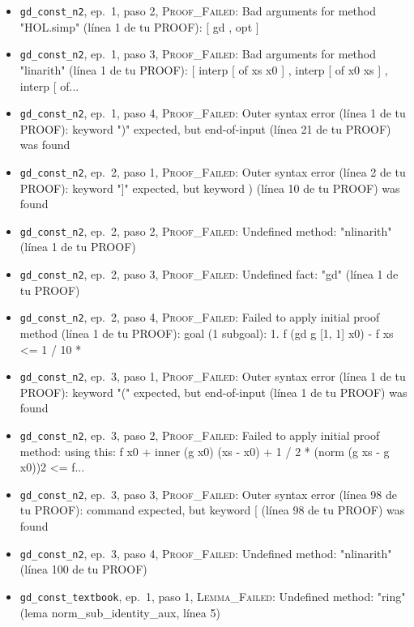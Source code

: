 \documentclass[11pt,a4paper]{article}
\begin{document}
{\begin{itemize}
  \item \texttt{gd\_\allowbreak{}const\_\allowbreak{}n2}, ep.~1, paso 2, \textsc{Proof\_Failed}: Bad arguments for method "HOL.simp" (línea 1 de tu PROOF): [ gd , opt ]
  \item \texttt{gd\_\allowbreak{}const\_\allowbreak{}n2}, ep.~1, paso 3, \textsc{Proof\_Failed}: Bad arguments for method "linarith" (línea 1 de tu PROOF): [ interp [ of xs x0 ] , interp [ of x0 xs ] , interp [ of...
  \item \texttt{gd\_\allowbreak{}const\_\allowbreak{}n2}, ep.~1, paso 4, \textsc{Proof\_Failed}: Outer syntax error (línea 1 de tu PROOF): keyword ")" expected, but end-of-input (línea 21 de tu PROOF) was found
  \item \texttt{gd\_\allowbreak{}const\_\allowbreak{}n2}, ep.~2, paso 1, \textsc{Proof\_Failed}: Outer syntax error (línea 2 de tu PROOF): keyword "]" expected, but keyword ) (línea 10 de tu PROOF) was found
  \item \texttt{gd\_\allowbreak{}const\_\allowbreak{}n2}, ep.~2, paso 2, \textsc{Proof\_Failed}: Undefined method: "nlinarith" (línea 1 de tu PROOF)
  \item \texttt{gd\_\allowbreak{}const\_\allowbreak{}n2}, ep.~2, paso 3, \textsc{Proof\_Failed}: Undefined fact: "gd" (línea 1 de tu PROOF)
  \item \texttt{gd\_\allowbreak{}const\_\allowbreak{}n2}, ep.~2, paso 4, \textsc{Proof\_Failed}: Failed to apply initial proof method (línea 1 de tu PROOF): goal (1 subgoal): 1. f (gd g [1, 1] x0) - f xs <= 1 / 10 *
  \item \texttt{gd\_\allowbreak{}const\_\allowbreak{}n2}, ep.~3, paso 1, \textsc{Proof\_Failed}: Outer syntax error (línea 1 de tu PROOF): keyword "(" expected, but end-of-input (línea 1 de tu PROOF) was found
  \item \texttt{gd\_\allowbreak{}const\_\allowbreak{}n2}, ep.~3, paso 2, \textsc{Proof\_Failed}: Failed to apply initial proof method: using this: f x0 + inner (g x0) (xs - x0) + 1 / 2 * (norm (g xs - g x0))2 <= f...
  \item \texttt{gd\_\allowbreak{}const\_\allowbreak{}n2}, ep.~3, paso 3, \textsc{Proof\_Failed}: Outer syntax error (línea 98 de tu PROOF): command expected, but keyword [ (línea 98 de tu PROOF) was found
  \item \texttt{gd\_\allowbreak{}const\_\allowbreak{}n2}, ep.~3, paso 4, \textsc{Proof\_Failed}: Undefined method: "nlinarith" (línea 100 de tu PROOF)
  \item \texttt{gd\_\allowbreak{}const\_\allowbreak{}textbook}, ep.~1, paso 1, \textsc{Lemma\_Failed}: Undefined method: "ring" (lema norm\_sub\_identity\_aux, línea 5)

\end{itemize}}
\end{document}
